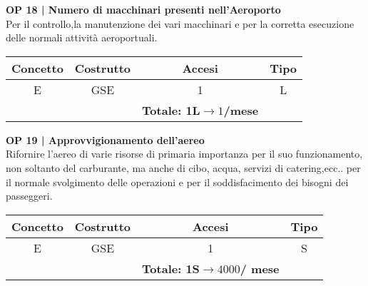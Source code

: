 \vspace{.6cm}


\textbf{\small OP 18 | Numero di macchinari presenti nell'Aeroporto}\\

\textsf{\small Per il controllo,la manutenzione dei vari macchinari e per la corretta esecuzione delle normali attività aeroportuali.}\break

\begin{tabular}{ c c c c}
	\hline
	\textbf{Concetto} & \textbf{Costrutto} & \textbf{Accesi} & \textbf{Tipo}\\
	\hline
	\textsf{\small E} & \textsf{\small GSE} & \textsf{\small 1} &  \textsf{\small L}\\
	\hline
	\textsf{\small } & \textsf{\small } & \textbf{Totale: 1L$\rightarrow 1$/mese } \textsf{\small } & \textsf{\small }\\
	\hline
\end{tabular}

\vspace{.6cm}


\textbf{\small OP 19 | Approvvigionamento dell'aereo}\\

\textsf{\small Rifornire l'aereo di varie risorse di primaria importanza per il suo funzionamento, non soltanto del carburante, ma anche di cibo, acqua, servizi di catering,ecc.. per il normale svolgimento delle operazioni e per il soddisfacimento dei bisogni dei passeggeri.}\break

\begin{tabular}{ c c c c}
	\hline
	\textbf{Concetto} & \textbf{Costrutto} & \textbf{Accesi} & \textbf{Tipo}\\
	\hline
	\textsf{\small E} & \textsf{\small GSE} & \textsf{\small 1} &  \textsf{\small S}\\
	\hline
	\textsf{\small } & \textsf{\small } & \textbf{Totale: 1S$\rightarrow 4000$/ mese} \textsf{\small } & \textsf{\small }\\
	\hline
\end{tabular}

\vspace{.6cm}


